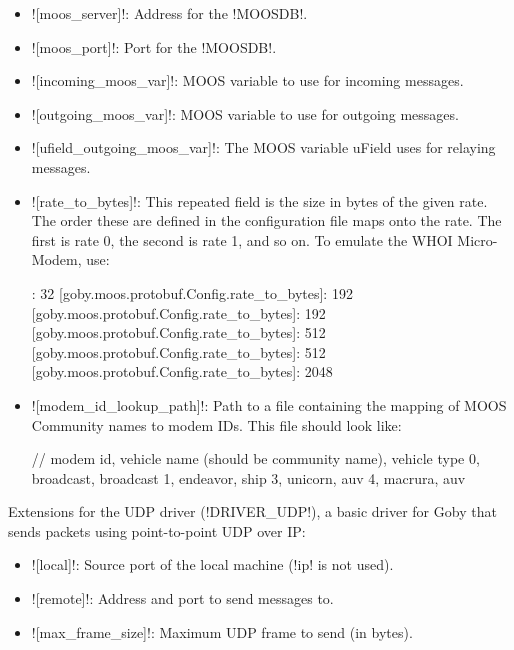 \begin{itemize}
\item ![moos_server]!: Address for the !MOOSDB!.
\item ![moos_port]!: Port for the !MOOSDB!.
\item ![incoming_moos_var]!: MOOS variable to use for incoming messages.
\item ![outgoing_moos_var]!: MOOS variable to use for outgoing messages.
\item ![ufield_outgoing_moos_var]!: The MOOS variable uField uses for relaying messages.
\item ![rate_to_bytes]!: This repeated field is the size in bytes of the given rate. The order these are defined in the configuration file maps onto the rate. The first is rate 0, the second is rate 1, and so on. To emulate the WHOI Micro-Modem, use:
\begin{boxedverbatim}
: 32 
[goby.moos.protobuf.Config.rate_to_bytes]: 192 
[goby.moos.protobuf.Config.rate_to_bytes]: 192 
[goby.moos.protobuf.Config.rate_to_bytes]: 512 
[goby.moos.protobuf.Config.rate_to_bytes]: 512 
[goby.moos.protobuf.Config.rate_to_bytes]: 2048 
\end{boxedverbatim}
\resetbvlinenumber
\item ![modem_id_lookup_path]!: Path to a file containing the mapping of MOOS Community names to modem IDs.  This file should look like:
\begin{boxedverbatim}
// modem id, vehicle name (should be community name), vehicle type
0, broadcast, broadcast
1, endeavor, ship
3, unicorn, auv
4, macrura, auv
\end{boxedverbatim}
\resetbvlinenumber

\end{itemize} 

Extensions for the UDP driver (!DRIVER_UDP!), a basic driver for Goby that sends packets using point-to-point UDP over IP:
\resetbvlinenumber

\begin{itemize}
\item ![local]!: Source port of the local machine (!ip! is not used).
\item ![remote]!: Address and port to send messages to. 
\item ![max_frame_size]!: Maximum UDP frame to send (in bytes).
\end{itemize} 

